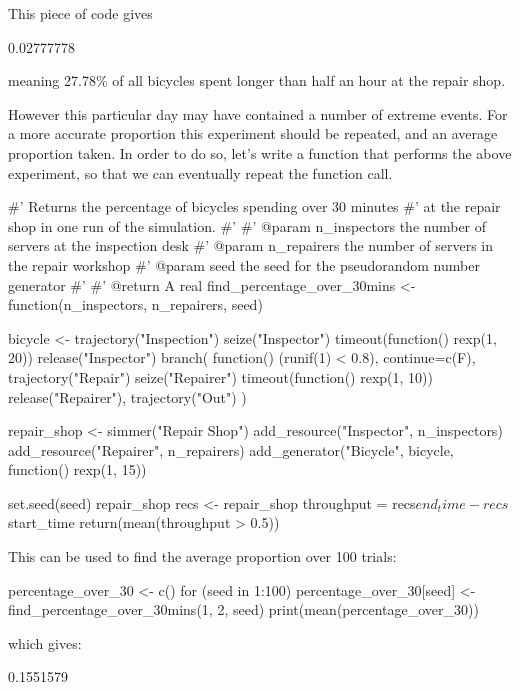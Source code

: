 This piece of code gives

\begin{Rout}
[1] 0.02777778
\end{Rout}

meaning 27.78\% of all bicycles spent longer than half an hour at the repair
shop.

However this particular day may have contained a number of extreme events.
For a more accurate proportion this experiment should be repeated, and an
average proportion taken.
In order to do so, let's write a function that performs the above experiment, so
that we can eventually repeat the function call.

\begin{Rin}
#' Returns the percentage of bicycles spending over 30 minutes
#' at the repair shop in one run of the simulation.
#'
#' @param n_inspectors the number of servers at the inspection desk
#' @param n_repairers the number of servers in the repair workshop
#' @param seed the seed for the pseudorandom number generator
#'
#' @return A real
find_percentage_over_30mins <- function(n_inspectors, n_repairers, seed) {
  bicycle <-
    trajectory("Inspection") %
    seize("Inspector") %
    timeout(function() {rexp(1, 20)}) %
    release("Inspector") %
    branch(
      function() (runif(1) < 0.8), continue=c(F),
      trajectory("Repair") %
        seize("Repairer") %
        timeout(function() {rexp(1, 10)}) %
        release("Repairer"),
      trajectory("Out")
    )

  repair_shop <-
    simmer("Repair Shop") %
    add_resource("Inspector", n_inspectors) %
    add_resource("Repairer", n_repairers) %
    add_generator("Bicycle", bicycle, function() {rexp(1, 15)})

  set.seed(seed)
  repair_shop %
  recs <- repair_shop %
  throughput = recs$end_time - recs$start_time
  return(mean(throughput > 0.5))
}
\end{Rin}

This can be used to find the average proportion over 100 trials:

\begin{Rin}
percentage_over_30 <- c()
for (seed in 1:100) {
  percentage_over_30[seed] <- find_percentage_over_30mins(1, 2, seed)
}
print(mean(percentage_over_30))
\end{Rin}

which gives:

\begin{Rout}
[1] 0.1551579
\end{Rout}

